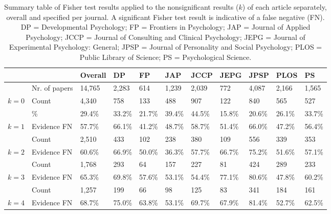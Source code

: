 \documentclass{article}
\begin{document}
\begin{table}[htbp]
\caption{Summary table of Fisher test results applied to the nonsignificant results ($k$) of each article separately, overall and specified per journal. A significant Fisher test result is indicative of a false negative (FN). DP = Developmental Psychology; FP = Frontiers in Psychology; JAP = Journal of Applied Psychology; JCCP = Journal of Consulting and Clinical Psychology; JEPG = Journal of Experimental Psychology: General; JPSP = Journal of Personality and Social Psychology; PLOS = Public Library of Science; PS = Psychological Science.}
\begin{adjustbox}{width=\textwidth,totalheight=\textheight,keepaspectratio,angle=0}
\centering
\begin{tabular}{lllllllllll}
 &  & Overall             & DP                & FP     & JAP    & JCCP   & JEPG   & JPSP   & PLOS   & PS \\
\hline
& Nr. of papers     & 14,765  & 2,283   & 614    & 1,239   & 2,039   & 772    & 4,087   & 2,166   & 1,565   \\
$k=0$               & Count             & 4,340   & 758    & 133    & 488    & 907    & 122    & 840    & 565    & 527    \\
& \%                & 29.4\% & 33.2\% & 21.7\% & 39.4\% & 44.5\% & 15.8\% & 20.6\% & 26.1\% & 33.7\% \\
\hline
$k=1$               & Evidence FN       & 57.7\% & 66.1\% & 41.2\% & 48.7\% & 58.7\% & 51.4\% & 66.0\% & 47.2\% & 56.4\% \\
& Count             & 2,510   & 433    & 102    & 238    & 380    & 109    & 556    & 339    & 353    \\
$k=2$               & Evidence FN       & 60.6\% & 66.9\% & 50.0\% & 36.3\% & 57.7\% & 66.7\% & 75.2\% & 51.6\% & 57.1\% \\
& Count             & 1,768   & 293    & 64     & 157    & 227    & 81     & 424    & 289    & 233    \\
$k=3$               & Evidence FN       & 65.3\% & 69.8\% & 57.6\% & 53.1\% & 54.4\% & 77.1\% & 80.6\% & 47.8\% & 60.2\% \\
& Count             & 1,257   & 199    & 66     & 98     & 125    & 83     & 341    & 184    & 161    \\
$k=4$               & Evidence FN       & 68.7\% & 75.0\% & 63.8\% & 53.1\% & 69.7\% & 67.9\% & 81.4\% & 52.7\% & 62.5\% \\

\end{tabular}
\end{adjustbox}
\end{table}
\end{document}
